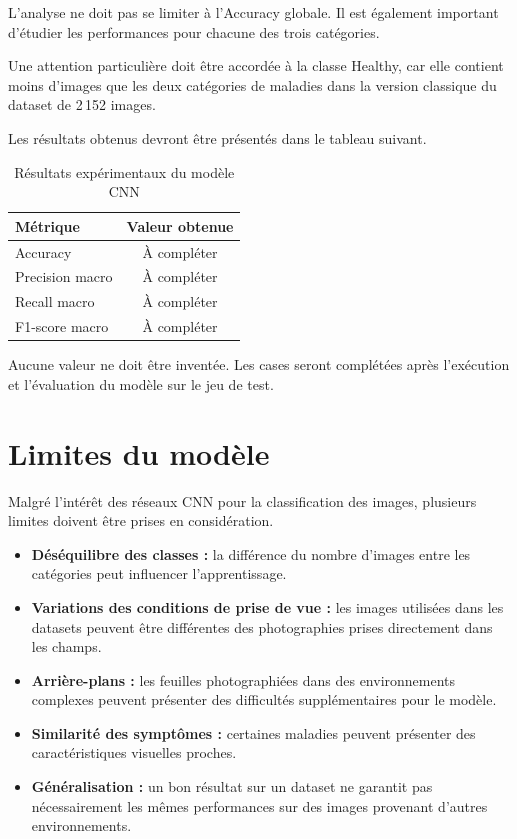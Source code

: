 \documentclass[12pt,a4paper,oneside]{report}
\begin{document}
L'analyse ne doit pas se limiter à l'Accuracy globale.
Il est également important d'étudier les performances
pour chacune des trois catégories.

Une attention particulière doit être accordée à la
classe Healthy, car elle contient moins d'images que
les deux catégories de maladies dans la version classique
du dataset de 2\,152 images.

Les résultats obtenus devront être présentés dans
le tableau suivant.

\begin{table}[H]
\centering
\caption{Résultats expérimentaux du modèle CNN}
\begin{tabular}{lc}
\toprule
\textbf{Métrique} & \textbf{Valeur obtenue}\\
\midrule
Accuracy & À compléter\\
Precision macro & À compléter\\
Recall macro & À compléter\\
F1-score macro & À compléter\\
\bottomrule
\end{tabular}
\end{table}

Aucune valeur ne doit être inventée. Les cases seront
complétées après l'exécution et l'évaluation du modèle
sur le jeu de test.

\section{Limites du modèle}

Malgré l'intérêt des réseaux CNN pour la classification
des images, plusieurs limites doivent être prises
en considération.

\begin{itemize}
    \item \textbf{Déséquilibre des classes :}
    la différence du nombre d'images entre les catégories
    peut influencer l'apprentissage.

    \item \textbf{Variations des conditions de prise de vue :}
    les images utilisées dans les datasets peuvent être
    différentes des photographies prises directement
    dans les champs.

    \item \textbf{Arrière-plans :}
    les feuilles photographiées dans des environnements
    complexes peuvent présenter des difficultés
    supplémentaires pour le modèle.

    \item \textbf{Similarité des symptômes :}
    certaines maladies peuvent présenter des caractéristiques
    visuelles proches.

    \item \textbf{Généralisation :}
    un bon résultat sur un dataset ne garantit pas
    nécessairement les mêmes performances sur des
    images provenant d'autres environnements.
\end{itemize}
\end{document}
